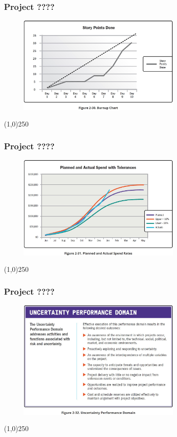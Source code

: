 \begin{frame}
\frametitle{Project ????}
 \begin{figure}
    \centering
        \includegraphics[width = 8cm]{../images/guide/Fig2-30.jpg}
    \label{guidefig:2-30}
 \end{figure}
\end{frame}
\begin{center}\line(1,0){250}\end{center}

\begin{frame}
\frametitle{Project ????}
 \begin{figure}
    \centering
        \includegraphics[width = 8cm]{../images/guide/Fig2-31.jpg}
    \label{guidefig:2-31}
 \end{figure}
\end{frame}
\begin{center}\line(1,0){250}\end{center}

\begin{frame}
\frametitle{Project ????}
 \begin{figure}
    \centering
        \includegraphics[width = 8cm]{../images/guide/Fig2-32.jpg}
    \label{guidefig:2-32}
 \end{figure}
\end{frame}
\begin{center}\line(1,0){250}\end{center}

